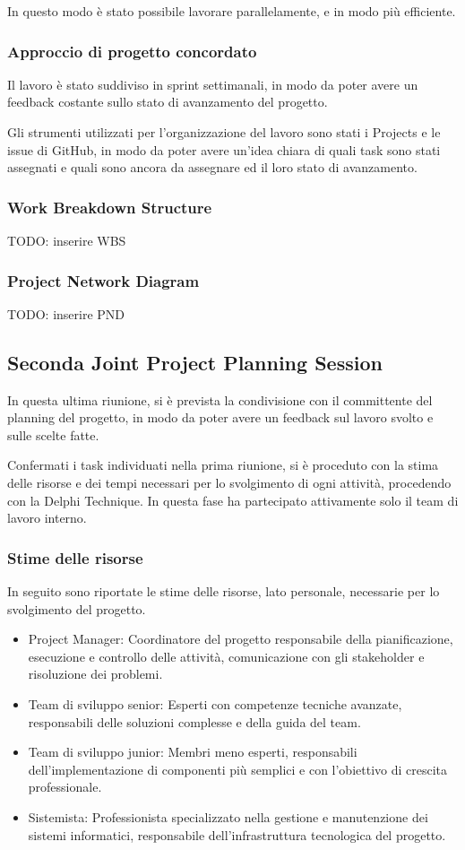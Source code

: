 In questo modo è stato possibile lavorare parallelamente, e in modo più efficiente.

\subsubsection{Approccio di progetto concordato}
Il lavoro è stato suddiviso in sprint settimanali, in modo da poter avere un feedback costante sullo stato di avanzamento
del progetto.

Gli strumenti utilizzati per l'organizzazione del lavoro sono stati i Projects e le issue di GitHub, in modo da poter
avere un'idea chiara di quali task sono stati assegnati e quali sono ancora da assegnare ed il loro stato di avanzamento.

\subsubsection{Work Breakdown Structure}
TODO: inserire WBS
\subsubsection{Project Network Diagram}
TODO: inserire PND

\subsection{Seconda Joint Project Planning Session}
In questa ultima riunione, si è prevista la condivisione con il committente del planning del progetto, in modo da
poter avere un feedback sul lavoro svolto e sulle scelte fatte.

Confermati i task individuati nella prima riunione, si è proceduto con la stima delle risorse e dei tempi necessari
per lo svolgimento di ogni attività, procedendo con la Delphi Technique. In questa fase ha partecipato attivamente
solo il team di lavoro interno.

\subsubsection{Stime delle risorse}
In seguito sono riportate le stime delle risorse, lato personale, necessarie per lo svolgimento del progetto.

\begin{itemize}
    \item Project Manager: Coordinatore del progetto responsabile della pianificazione, esecuzione e controllo delle attività, comunicazione con gli stakeholder e risoluzione dei problemi.
    \item Team di sviluppo senior: Esperti con competenze tecniche avanzate, responsabili delle soluzioni complesse e della guida del team.
    \item Team di sviluppo junior: Membri meno esperti, responsabili dell'implementazione di componenti più semplici e con l'obiettivo di crescita professionale.
    \item Sistemista: Professionista specializzato nella gestione e manutenzione dei sistemi informatici, responsabile dell'infrastruttura tecnologica del progetto.
\end{itemize}

